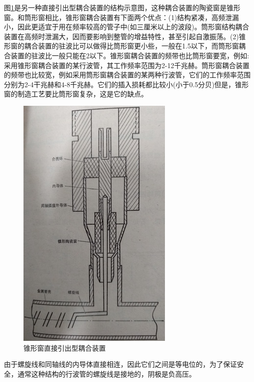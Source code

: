 图\ref{ch9-2}是另一种直接引出型耦合装置的结构示意图，这种耦合装置的陶瓷窗是锥形窗。和筒形窗相比，锥形窗耦合装置有下面两个优点：(1)结构紧凑，高频泄漏小，因此更适宜于用在频率较高的管子中(如三厘米以上的波段)。筒形窗结构耦合装置在高频时泄漏大，因而要影响到整管的增益特性，甚至引起自激振荡。(2)锥形窗的耦合装置的驻波比可以做得比筒形窗更小些，一般在1.5以下，而筒形窗耦合装置的驻波比一般只能在2以下。锥形窗耦合装置的频带也比筒形窗要宽，例如:采用锥形窗耦合装置的某行波管，其工作频率范围为2-12千兆赫。筒形窗耦合装置的频带也比较宽，例如采用筒形窗耦合装置的某两种行波管，它们的工作频率范围分别为2-4干兆赫和4-8千兆赫。它们的插入损耗都比较小(小于0.5分贝)但是，锥形窗的制造工艺要比筒形窗复杂，这是它的缺点。
\begin{figure}[phtb]
	\centering
	\includegraphics[width=0.7\linewidth]{figure/ch9-2}
	\caption{ 锥形窗直接引出型耦合装置}
	\label{ch9-2}
\end{figure}

由于螺旋线和同轴线的内导体直接相连，因此它们之间是等电位的，为了保证安全，通常这种结构的行波管的螺旋线是接地的，阴极是负高压。

